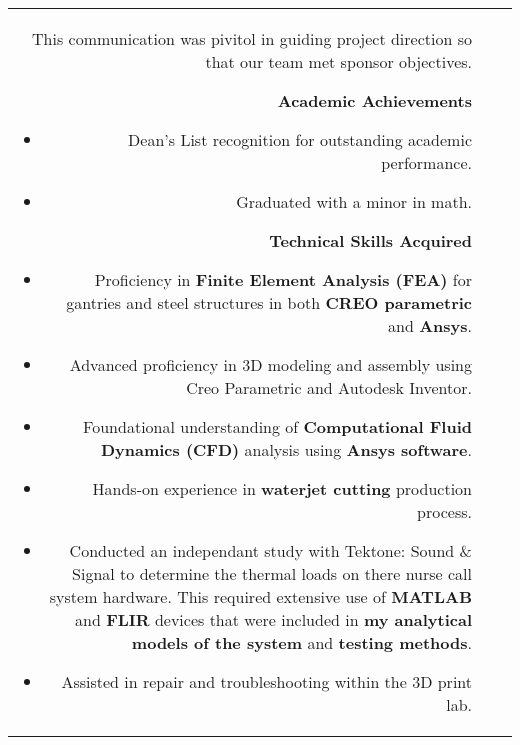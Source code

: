 \documentclass[allblack]{simplehipstercv}
\begin{document}
\begin{paracol}{2}
\begin{tabular}{r| p{} c}
{\begin{itemize}
                This communication was pivitol in guiding project direction so that our team met sponsor objectives.
            \end{itemize}
            \textbf{Academic Achievements}
            \begin{itemize}
                \item Dean's List recognition for outstanding academic performance.
                \item Graduated with a minor in math.
            \end{itemize}
            \textbf{Technical Skills Acquired}
            \begin{itemize}
                \item Proficiency in \textbf{Finite Element Analysis (FEA)} for gantries and steel structures in both \textbf{CREO parametric} and \textbf{Ansys}.
                \item Advanced proficiency in 3D modeling and assembly using Creo Parametric and Autodesk Inventor.
                \item Foundational understanding of \textbf{Computational Fluid Dynamics (CFD)} analysis using \textbf{Ansys software}.
                \item Hands-on experience in \textbf{waterjet cutting} production process.
                \item Conducted an independant study with Tektone: Sound \& Signal to determine the thermal loads on there nurse call system hardware. This required extensive use of \textbf{MATLAB} and \textbf{FLIR} devices that were included in \textbf{my analytical models of the system} and \textbf{testing methods}.
                \item Assisted in repair and troubleshooting within the 3D print lab.
            \end{itemize}
        } \\
        

\end{tabular}
\end{paracol}
\end{document}
